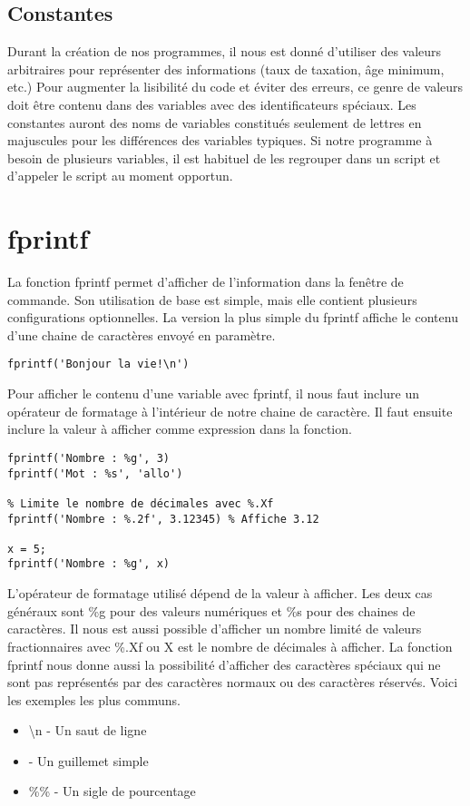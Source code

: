 \documentclass{tufte-handout}
\begin{document}
\subsection{Constantes}
Durant la création de nos programmes, il nous est donné d'utiliser des valeurs arbitraires pour représenter des informations (taux de taxation, âge minimum, etc.) Pour augmenter la lisibilité du code et éviter des erreurs, ce genre de valeurs doit être contenu dans des variables avec des identificateurs spéciaux. Les constantes auront des noms de variables constitués seulement de lettres en majuscules pour les différences des variables typiques.
Si notre programme à besoin de plusieurs variables, il est habituel de les regrouper dans un script et d'appeler le script au moment opportun.

\section{fprintf}
La fonction fprintf permet d'afficher de l'information dans la fenêtre de commande. Son utilisation de base est simple, mais elle contient plusieurs configurations optionnelles.
La version la plus simple du fprintf affiche le contenu d'une chaine de caractères envoyé en paramètre.
\begin{lstlisting}[title={Simple fprintf}]
fprintf('Bonjour la vie!\n')
\end{lstlisting}
Pour afficher le contenu d'une variable avec fprintf, il nous faut inclure un opérateur de formatage à l'intérieur de notre chaine de caractère. Il faut ensuite inclure la valeur à afficher comme expression dans la fonction.
\begin{lstlisting}[title={fprintf avec opérateur de formatage}]
fprintf('Nombre : %g', 3)
fprintf('Mot : %s', 'allo')

% Limite le nombre de décimales avec %.Xf
fprintf('Nombre : %.2f', 3.12345) % Affiche 3.12

x = 5;
fprintf('Nombre : %g', x)
\end{lstlisting}
L'opérateur de formatage utilisé dépend de la valeur à afficher. Les deux cas généraux sont \%g pour des valeurs numériques et \%s pour des chaines de caractères. Il nous est aussi possible d'afficher un nombre limité de valeurs fractionnaires avec \%.Xf ou X est le nombre de décimales à afficher.
La fonction fprintf nous donne aussi la possibilité d'afficher des caractères spéciaux qui ne sont pas représentés par des caractères normaux ou des caractères réservés. Voici les exemples les plus communs.
\begin{itemize}
    \item \textbackslash{}n - Un saut de ligne
    \item \textquotesingle\textquotesingle - Un guillemet simple
    \item \%\% - Un sigle de pourcentage
\end{itemize}
\end{document}
